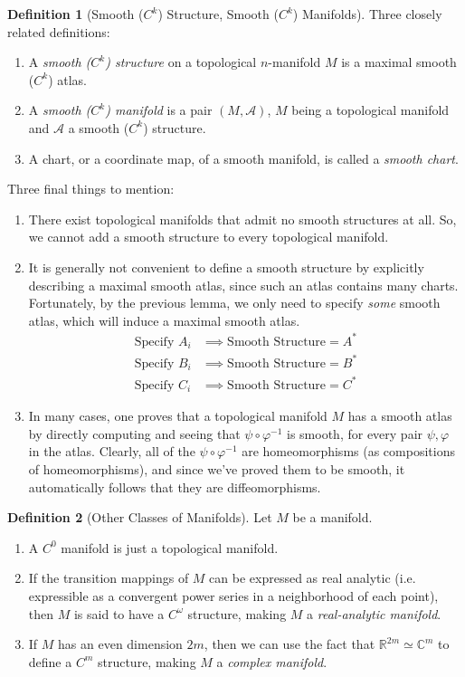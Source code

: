 \documentclass{article}
\theoremstyle{remark}
\theoremstyle{definition}
\newtheorem{definition}{Definition}[section]
\begin{document}
\begin{definition}[Smooth ($C^k$) Structure, Smooth ($C^k$) Manifolds]
Three closely related definitions: 
\begin{enumerate}
    \item A \textit{smooth ($C^k$) structure} on a topological $n$-manifold $M$ is a maximal smooth ($C^k$) atlas.
    \item A \textit{smooth ($C^k$) manifold} is a pair $(M, \mathcal{A})$, $M$ being a topological manifold and $\mathcal{A}$ a smooth ($C^k$) structure. 
    \item A chart, or a coordinate map, of a smooth manifold, is called a \textit{smooth chart}. 
\end{enumerate}
\end{definition}

Three final things to mention:
\begin{enumerate}
    \item There exist topological manifolds that admit no smooth structures at all. So, we cannot add a smooth structure to every topological manifold. 
    \item It is generally not convenient to define a smooth structure by explicitly describing a maximal smooth atlas, since such an atlas contains many charts. Fortunately, by the previous lemma, we only need to specify \textit{some} smooth atlas, which will induce a maximal smooth atlas. 
    \begin{align*}
        \text{Specify } A_i & \implies \text{Smooth Structure} = A^*\\
        \text{Specify } B_i & \implies \text{Smooth Structure} = B^*\\
        \text{Specify } C_i & \implies \text{Smooth Structure} = C^*
    \end{align*}
    \item In many cases, one proves that a topological manifold $M$ has a smooth atlas by directly computing and seeing that $\psi \circ \varphi^{-1}$ is smooth, for every pair $\psi, \varphi$ in the atlas. Clearly, all of the $\psi \circ \varphi^{-1}$ are homeomorphisms (as compositions of homeomorphisms), and since we've proved them to be smooth, it automatically follows that they are diffeomorphisms. 
\end{enumerate}

\begin{definition}[Other Classes of Manifolds] Let $M$ be a manifold. 
\begin{enumerate}
    \item A $C^0$ manifold is just a topological manifold. 
    \item If the transition mappings of $M$ can be expressed as real analytic (i.e. expressible as a convergent power series in a neighborhood of each point), then $M$ is said to have a $C^\omega$ structure, making $M$ a \textit{real-analytic manifold}. 
    \item If $M$ has an even dimension $2m$, then we can use the fact that $\mathbb{R}^{2m} \simeq \mathbb{C}^m$ to define a $C^m$ structure, making $M$ a \textit{complex manifold}. 
\end{enumerate}
\end{definition}
\end{document}
